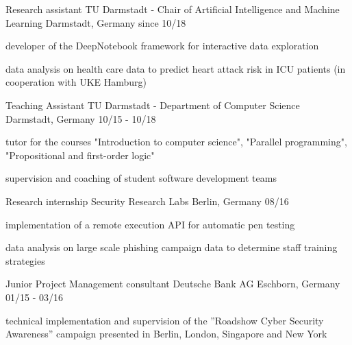 

\begin{cventries}

  \cventry
    {Research assistant}
    {TU Darmstadt - Chair of Artificial Intelligence and Machine Learning}
    {Darmstadt, Germany}
    {since 10/18}
    {
        \begin{cvitems}
        \item {developer of the DeepNotebook framework for interactive data exploration}
        \item {data analysis on health care data to predict heart attack risk in ICU patients (in cooperation with UKE Hamburg)}
        \end{cvitems}
    }
  \cventry
    {Teaching Assistant} %
    {TU Darmstadt - Department of Computer Science} %
    {Darmstadt, Germany} %
    {10/15 - 10/18} %
    {
      \begin{cvitems} %
        \item {tutor for the courses "Introduction to computer science", "Parallel programming", "Propositional and first-order logic"}
        \item {supervision and coaching of student software development teams}
      \end{cvitems}
    }

  \cventry
    {Research internship} %
    {Security Research Labs} %
    {Berlin, Germany} %
    {08/16} %
    {
      \begin{cvitems} %
        \item {implementation of a remote execution API for automatic pen testing}
        \item {data analysis on large scale phishing campaign data to determine staff training strategies}
      \end{cvitems}
    }
  \cventry
    {Junior Project Management consultant} %
    {Deutsche Bank AG} %
    {Eschborn, Germany} %
    {01/15 - 03/16} %
    {
      \begin{cvitems} %
        \item {technical implementation and supervision of the ”Roadshow Cyber Security
Awareness” campaign presented in Berlin, London, Singapore and New York}
      \end{cvitems}
    }

\end{cventries}
